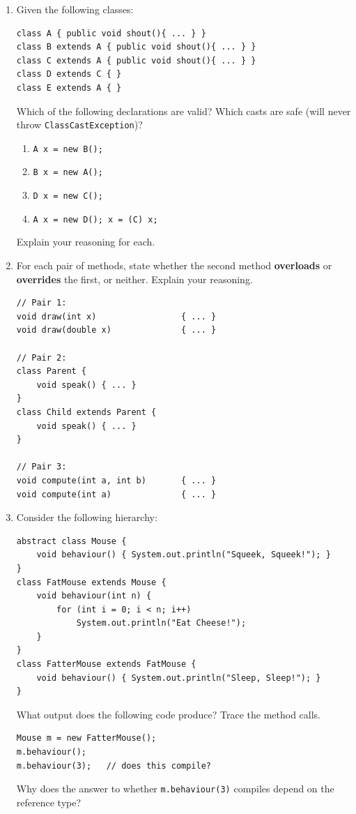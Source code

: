 \documentclass[twoside=false,DIV=14]{scrartcl}
\begin{document}
\begin{enumerate}
\item Given the following classes:
\begin{verbatim}
class A { public void shout(){ ... } }
class B extends A { public void shout(){ ... } }
class C extends A { public void shout(){ ... } }
class D extends C { }
class E extends A { }
\end{verbatim}
Which of the following declarations are valid?  Which casts are safe (will never throw \texttt{ClassCastException})?
\begin{enumerate}
    \item \texttt{A x = new B();}
    \item \texttt{B x = new A();}
    \item \texttt{D x = new C();}
    \item \texttt{A x = new D(); \quad x = (C) x;}
\end{enumerate}
Explain your reasoning for each.

\item For each pair of methods, state whether the second method \textbf{overloads} or \textbf{overrides} the first, or neither.  Explain your reasoning.
\begin{verbatim}
// Pair 1:
void draw(int x)                 { ... }
void draw(double x)              { ... }

// Pair 2:
class Parent {
    void speak() { ... }
}
class Child extends Parent {
    void speak() { ... }
}

// Pair 3:
void compute(int a, int b)       { ... }
void compute(int a)              { ... }
\end{verbatim}

\item Consider the following hierarchy:
\begin{verbatim}
abstract class Mouse {
    void behaviour() { System.out.println("Squeek, Squeek!"); }
}
class FatMouse extends Mouse {
    void behaviour(int n) {
        for (int i = 0; i < n; i++)
            System.out.println("Eat Cheese!");
    }
}
class FatterMouse extends FatMouse {
    void behaviour() { System.out.println("Sleep, Sleep!"); }
}
\end{verbatim}
What output does the following code produce?  Trace the method calls.
\begin{verbatim}
Mouse m = new FatterMouse();
m.behaviour();
m.behaviour(3);   // does this compile?
\end{verbatim}
Why does the answer to whether \texttt{m.behaviour(3)} compiles depend on the reference type?


\end{enumerate}
\end{document}

